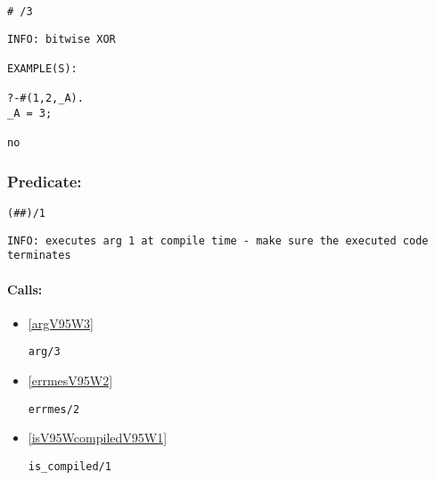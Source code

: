 \begin{verbatim}
# /3
\end{verbatim}

{\small \begin{verbatim}
INFO: bitwise XOR

EXAMPLE(S):

?-#(1,2,_A).
_A = 3;

no

\end{verbatim}}

\subsubsection{Predicate:} \label{V35WV35WV95W1}

\begin{verbatim}
(##)/1
\end{verbatim}

{\small \begin{verbatim}
INFO: executes arg 1 at compile time - make sure the executed code terminates

\end{verbatim}}
\paragraph{Calls:} 
\begin{itemize}
\item \ref{argV95W3} 
\begin{verbatim}
arg/3
\end{verbatim}

\item \ref{errmesV95W2} 
\begin{verbatim}
errmes/2
\end{verbatim}

\item \ref{isV95WcompiledV95W1} 
\begin{verbatim}
is_compiled/1
\end{verbatim}

\end{itemize}
